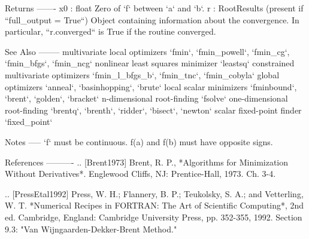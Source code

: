 \begin{DoxyVerb}
Returns
-------
x0 : float
    Zero of `f` between `a` and `b`.
r : RootResults (present if ``full_output = True``)
    Object containing information about the convergence.  In particular,
    ``r.converged`` is True if the routine converged.

See Also
--------
multivariate local optimizers
  `fmin`, `fmin_powell`, `fmin_cg`, `fmin_bfgs`, `fmin_ncg`
nonlinear least squares minimizer
  `leastsq`
constrained multivariate optimizers
  `fmin_l_bfgs_b`, `fmin_tnc`, `fmin_cobyla`
global optimizers
  `anneal`, `basinhopping`, `brute`
local scalar minimizers
  `fminbound`, `brent`, `golden`, `bracket`
n-dimensional root-finding
  `fsolve`
one-dimensional root-finding
  `brentq`, `brenth`, `ridder`, `bisect`, `newton`
scalar fixed-point finder
  `fixed_point`

Notes
-----
`f` must be continuous.  f(a) and f(b) must have opposite signs.


References
----------
.. [Brent1973]
   Brent, R. P.,
   *Algorithms for Minimization Without Derivatives*.
   Englewood Cliffs, NJ: Prentice-Hall, 1973. Ch. 3-4.

.. [PressEtal1992]
   Press, W. H.; Flannery, B. P.; Teukolsky, S. A.; and Vetterling, W. T.
   *Numerical Recipes in FORTRAN: The Art of Scientific Computing*, 2nd ed.
   Cambridge, England: Cambridge University Press, pp. 352-355, 1992.
   Section 9.3:  "Van Wijngaarden-Dekker-Brent Method."\end{DoxyVerb}
 \hypertarget{namespacescipy_1_1optimize_1_1zeros_a68360f1b4d04cd5b9b379ad9c9f83d8b}{}

